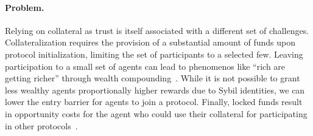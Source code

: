 \documentclass[runningheads]{llncs}
\newcommand{\aza}[1]{\todo[linecolor=blue,backgroundcolor=blue!25,bordercolor=blue,inline,caption={}]{Comment by Alexei: #1}}
\begin{document}
\paragraph{Problem.}
Relying on collateral as trust is itself associated with a different set of challenges. 
Collateralization requires the provision of a substantial amount of funds upon protocol initialization, limiting the set of participants to a selected few.
Leaving participation to a small set of agents can lead to phenomenos like ``rich are getting richer'' through wealth compounding~\cite{Fanti2019Compounding}.
While it is not possible to grant less wealthy agents proportionally higher rewards due to Sybil identities, we can lower the entry barrier for agents to join a protocol.
Finally, locked funds result in opportunity costs for the agent who could use their collateral for participating in other protocols~\cite{Harz2019Balance}.

\end{document}
